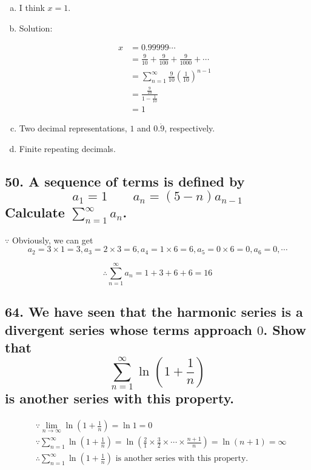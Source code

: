 \documentclass{article}
\begin{document}
    \begin{enumerate}[(a)]
        \item I think $x=1$.
        \item Solution:

        $$\begin{aligned}
            x &= 0.99999 \cdots \\
            &= \frac{9}{10} + \frac{9}{100} + \frac{9}{1000} + \cdots \\
            &= \sum_{n=1}^\infty \frac{9}{10} (\frac{1}{10})^{n-1} \\
            &= \frac{\frac{9}{10}}{1 - \frac{1}{10}} \\
            &= 1
        \end{aligned}$$
        \item Two decimal representations, $1$ and $0.\dot 9$, respectively.
        \item Finite repeating decimals.
    \end{enumerate}

    \subsection*{50. A sequence of terms is defined by $$a_1=1 \qquad a_n = (5-n)a_{n-1}$$Calculate $\sum_{n=1}^\infty a_n$.}

    $\because$ Obviously, we can get $$a_2 = 3 \times 1 = 3, a_3 = 2 \times 3 = 6, a_4 = 1 \times 6 = 6, a_5 = 0 \times 6 = 0, a_6 = 0, \cdots$$

    $$\therefore \sum_{n=1}^\infty a_n = 1 + 3 + 6 + 6 = 16$$

    \subsection*{64. We have seen that the harmonic series is a divergent series whose terms approach $0$. Show that $$\sum_{n=1}^\infty \ln(1 + \frac 1 n)$$ is another series with this property.}
    
    $$\begin{aligned}
        & \because \lim_{n\to\infty}\ln(1 + \frac 1 n) = \ln 1 = 0 \\
        & \because \sum_{n=1}^\infty \ln(1 + \frac 1 n) = \ln(\frac 2 1 \times \frac 3 2 \times \cdots \times \frac{n+1}{n}) = \ln(n+1) = \infty \\
        & \therefore \sum_{n=1}^\infty \ln(1+\frac 1 n) \textrm{ is another series with this property.}
    \end{aligned}$$
\end{document}
